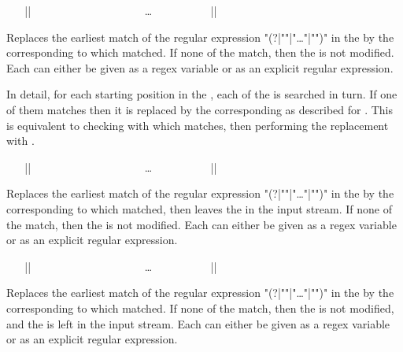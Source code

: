 \documentclass[oneside]{book}
\begin{document}
\begin{function}{\RegexReplaceCaseOnce}
\begin{syntax}
~ ~ |{|
~ ~ ~ ~  
~ ~ ~ ~  
~ ~ ~ ~ \ldots
~ ~ ~ ~  
~ ~ |}| 
\end{syntax}
Replaces the earliest match of the regular expression
"(?|""|"\dots"|"")" in the 
by the  corresponding to which  matched.
If none of the  match, then the
 is not modified. Each  can either be given as a regex
variable or as an explicit regular expression.
\par
In detail, for each starting position in the , each
of the  is searched in turn.  If one of them matches
then it is replaced by the corresponding  as
described for .  This is equivalent to
checking with  which  matches,
then performing the replacement with .
\end{function}

\begin{function}{\RegexReplaceCaseOnceT}
\begin{syntax}
~ ~ |{|
~ ~ ~ ~  
~ ~ ~ ~  
~ ~ ~ ~ \ldots
~ ~ ~ ~  
~ ~ |}| 
~ ~ 
\end{syntax}
Replaces the earliest match of the regular expression
"(?|""|"\dots"|"")" in the 
by the  corresponding to which
 matched, then leaves the  in the
input stream. If none of the  match, then the
 is not modified. Each  can either be given as a regex
variable or as an explicit regular expression.
\end{function}

\begin{function}{\RegexReplaceCaseOnceF}
\begin{syntax}
~ ~ |{|
~ ~ ~ ~  
~ ~ ~ ~  
~ ~ ~ ~ \ldots
~ ~ ~ ~  
~ ~ |}| 
~ ~ 
\end{syntax}
Replaces the earliest match of the regular expression
"(?|""|"\dots"|"")" in the 
by the  corresponding to which
 matched. If none of the  match, then the
 is not modified, and the  is left in
the input stream.  Each  can either be given as a regex
variable or as an explicit regular expression.
\end{function}
\end{document}
